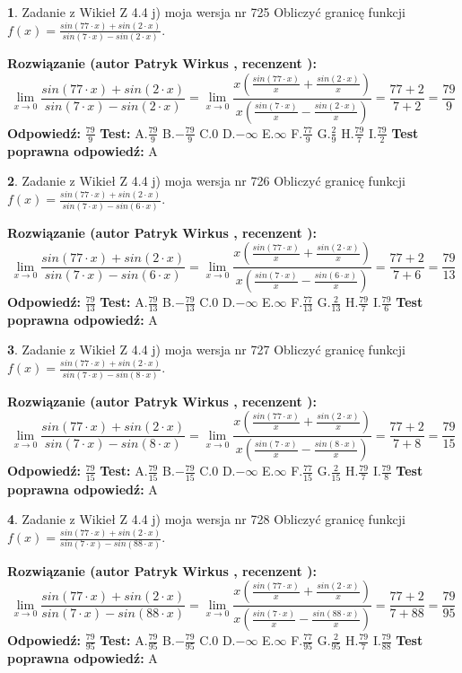 \documentclass[12pt, a4paper]{article}
\theoremstyle{definition} %
\newtheorem{zad}{}
\newcommand{\zadStart}[1]{\begin{zad}#1\newline}
\newcommand{\zadStop}{\end{zad}}
\newcommand{\rozwStart}[2]{\noindent \textbf{Rozwiązanie (autor #1 , recenzent #2): }\newline}
\newcommand{\rozwStop}{\newline}
\newcommand{\odpStart}{\noindent \textbf{Odpowiedź:}\newline}
\newcommand{\odpStop}{\newline}
\newcommand{\testStart}{\noindent \textbf{Test:}\newline}
\newcommand{\testStop}{\newline}
\newcommand{\kluczStart}{\noindent \textbf{Test poprawna odpowiedź:}\newline}
\newcommand{\kluczStop}{\newline}
\begin{document}
\zadStart{Zadanie z Wikieł Z 4.4 j) moja wersja nr 725}
Obliczyć granicę funkcji $f(x)=\frac{sin(77\cdot x) +sin(2\cdot x)}{sin(7\cdot x) -sin(2\cdot x)}$.
\zadStop
\rozwStart{Patryk Wirkus}{}
$$\lim\limits_{x\to 0}\frac{sin(77\cdot x) +sin(2\cdot x)}{sin(7\cdot x) -sin(2\cdot x)}=\lim\limits_{x\to 0}\frac{x(\frac{sin(77\cdot x)}{x}+\frac{sin(2\cdot x)}{x})}{x(\frac{sin(7\cdot x)}{x}-\frac{sin(2\cdot x)}{x})}=\frac{77+2}{7+2} = \frac{79}{9}$$
\rozwStop
\odpStart
$\frac{79}{9}$
\odpStop
\testStart
A.$\frac{79}{9}$
B.$-\frac{79}{9}$
C.$0$
D.$-\infty$
E.$\infty$
F.$\frac{77}{9}$
G.$\frac{2}{9}$
H.$\frac{79}{7}$
I.$\frac{79}{2}$
\testStop
\kluczStart
A
\kluczStop



\zadStart{Zadanie z Wikieł Z 4.4 j) moja wersja nr 726}
Obliczyć granicę funkcji $f(x)=\frac{sin(77\cdot x) +sin(2\cdot x)}{sin(7\cdot x) -sin(6\cdot x)}$.
\zadStop
\rozwStart{Patryk Wirkus}{}
$$\lim\limits_{x\to 0}\frac{sin(77\cdot x) +sin(2\cdot x)}{sin(7\cdot x) -sin(6\cdot x)}=\lim\limits_{x\to 0}\frac{x(\frac{sin(77\cdot x)}{x}+\frac{sin(2\cdot x)}{x})}{x(\frac{sin(7\cdot x)}{x}-\frac{sin(6\cdot x)}{x})}=\frac{77+2}{7+6} = \frac{79}{13}$$
\rozwStop
\odpStart
$\frac{79}{13}$
\odpStop
\testStart
A.$\frac{79}{13}$
B.$-\frac{79}{13}$
C.$0$
D.$-\infty$
E.$\infty$
F.$\frac{77}{13}$
G.$\frac{2}{13}$
H.$\frac{79}{7}$
I.$\frac{79}{6}$
\testStop
\kluczStart
A
\kluczStop



\zadStart{Zadanie z Wikieł Z 4.4 j) moja wersja nr 727}
Obliczyć granicę funkcji $f(x)=\frac{sin(77\cdot x) +sin(2\cdot x)}{sin(7\cdot x) -sin(8\cdot x)}$.
\zadStop
\rozwStart{Patryk Wirkus}{}
$$\lim\limits_{x\to 0}\frac{sin(77\cdot x) +sin(2\cdot x)}{sin(7\cdot x) -sin(8\cdot x)}=\lim\limits_{x\to 0}\frac{x(\frac{sin(77\cdot x)}{x}+\frac{sin(2\cdot x)}{x})}{x(\frac{sin(7\cdot x)}{x}-\frac{sin(8\cdot x)}{x})}=\frac{77+2}{7+8} = \frac{79}{15}$$
\rozwStop
\odpStart
$\frac{79}{15}$
\odpStop
\testStart
A.$\frac{79}{15}$
B.$-\frac{79}{15}$
C.$0$
D.$-\infty$
E.$\infty$
F.$\frac{77}{15}$
G.$\frac{2}{15}$
H.$\frac{79}{7}$
I.$\frac{79}{8}$
\testStop
\kluczStart
A
\kluczStop



\zadStart{Zadanie z Wikieł Z 4.4 j) moja wersja nr 728}
Obliczyć granicę funkcji $f(x)=\frac{sin(77\cdot x) +sin(2\cdot x)}{sin(7\cdot x) -sin(88\cdot x)}$.
\zadStop
\rozwStart{Patryk Wirkus}{}
$$\lim\limits_{x\to 0}\frac{sin(77\cdot x) +sin(2\cdot x)}{sin(7\cdot x) -sin(88\cdot x)}=\lim\limits_{x\to 0}\frac{x(\frac{sin(77\cdot x)}{x}+\frac{sin(2\cdot x)}{x})}{x(\frac{sin(7\cdot x)}{x}-\frac{sin(88\cdot x)}{x})}=\frac{77+2}{7+88} = \frac{79}{95}$$
\rozwStop
\odpStart
$\frac{79}{95}$
\odpStop
\testStart
A.$\frac{79}{95}$
B.$-\frac{79}{95}$
C.$0$
D.$-\infty$
E.$\infty$
F.$\frac{77}{95}$
G.$\frac{2}{95}$
H.$\frac{79}{7}$
I.$\frac{79}{88}$
\testStop
\kluczStart
A
\kluczStop
\end{document}

